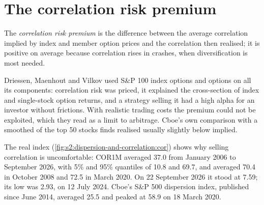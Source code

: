 \section{The correlation risk premium}

\begin{definition}\label{def:s2:dispersion-and-correlation:premium}
The \emph{correlation risk premium} is the difference between the average correlation implied by index and member
option prices and the correlation then realised; it is positive on average because correlation rises in crashes, when diversification is most needed.
\end{definition}

Driessen, Maenhout and Vilkov used S\&P 100 index options and options on all its components: correlation risk was priced, it explained the
cross-section of index and single-stock option returns, and a strategy selling it had a high alpha for an investor without frictions. With realistic
trading costs the premium could not be exploited, which they read as a limit to arbitrage. Cboe's own comparison with a smoothed 
of the top 50 stocks finds realised usually slightly below implied.

The real index (\cref{fig:s2:dispersion-and-correlation:cor}) shows why selling correlation is uncomfortable: COR1M averaged 37.0 from January 2006 to
September 2026, with 5\% and 95\% quantiles of 10.8 and 69.7, and averaged 70.4 in October 2008 and 72.5 in March 2020. On 22 September 2026 it stood at
7.59; its low was 2.93, on 12 July 2024. Cboe's S\&P 500 dispersion index, published since
June 2014, averaged 25.5 and peaked at 58.9 on 18 March 2020.

\begin{omfigure}

\label{fig:s2:dispersion-and-correlation:cor}
\end{omfigure}

